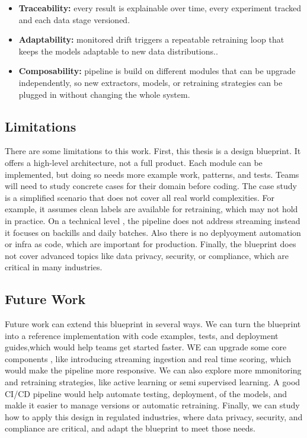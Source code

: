 \begin{itemize}
    \item \textbf{Traceability:} every result is explainable over time, every experiment tracked and each data stage versioned.
    \item \textbf{Adaptability:} monitored drift triggers a repeatable retraining loop that keeps the models adaptable to new data distributions..
    \item \textbf{Composability:} pipeline is build on different modules that can be upgrade independently, so new extractors, models, or retraining strategies can be plugged in without changing the whole system.
\end{itemize}

\subsection{Limitations}
There are some limitations to this work. First, this thesis is a design blueprint. It offers a high-level architecture, not a full product. Each module can be implemented, but doing so needs more example work, patterns, and tests. Teams will need to study concrete cases for their domain before coding. The case study is a simplified scenario that does not cover all real world complexities. For example, it assumes clean labels are available for retraining, which may not hold in practice. On a technical level , the pipeline does not address streaming instead it focuses on backills and daily batches. Also there is no deplyoyment automation or infra as code, which are important for production. Finally, the blueprint does not cover advanced topics like data privacy, security, or compliance, which are critical in many industries.

\subsection{Future Work}
Future work can extend this blueprint in several ways. We can turn the blueprint into a reference implementation with code examples, tests, and deployment guides,which  would help teams get started faster. WE can upgrade some core components , like introducing streaming ingestion and real time scoring, which would make the pipeline more responsive. We can also explore more mmonitoring and retraining strategies, like active learning or semi supervised learning. A good CI/CD pipeline would help automate testing, deployment, of the models, and makle it easier to manage versions or automatic retraining. Finally, we can study how to apply this design in regulated industries, where data privacy, security, and compliance are critical, and adapt the blueprint to meet those needs.

